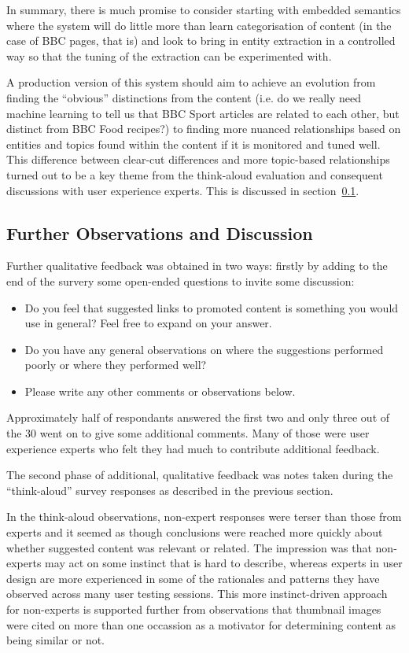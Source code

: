 In summary, there is much promise to consider starting with
embedded semantics where the system will do little more than learn
categorisation of content (in the case of BBC pages, that is) and
look to bring in entity extraction in a controlled way so that
the tuning of the extraction can be experimented with.

A production version of this system should aim to achieve an evolution
from finding the ``obvious'' distinctions from the content (i.e.
do we really need machine learning to tell us that BBC Sport articles
are related to each other, but distinct from BBC Food recipes?) to
finding more nuanced relationships based on entities and topics found
within the content if it is monitored and tuned well. This difference
between clear-cut differences and more topic-based relationships
turned out to be a key theme from the think-aloud evaluation and
consequent discussions with user experience experts. This is
discussed in section~\ref{sec:eval-obs}.

\subsection{Further Observations and Discussion}
\label{sec:eval-obs}

Further qualitative feedback was obtained in two ways: firstly by
adding to the end of the survery some open-ended questions to invite
some discussion:

\begin{itemize}
  \item Do you feel that suggested links to promoted content is something you would use in general? Feel free to expand on your answer.
  \item Do you have any general observations on where the suggestions performed poorly or where they performed well?
  \item Please write any other comments or observations below.
\end{itemize}

Approximately half of respondants answered the first two and only
three out of the 30 went on to give some additional comments. Many
of those were user experience experts who felt they had much to
contribute additional feedback.

The second phase of additional, qualitative feedback was notes taken
during the ``think-aloud'' survey responses as described in
the previous section.

In the think-aloud observations, non-expert responses were terser
than those from experts and it seemed as though conclusions were
reached more quickly about
whether suggested content was relevant or related. The impression was
that non-experts may act on some instinct that is hard to
describe, whereas experts in user design are more experienced in
some of the rationales and patterns they have observed across many
user testing sessions. This more instinct-driven approach for
non-experts is supported further from observations that thumbnail
images were cited on more than one occassion as a motivator for
determining content as being similar or not.

